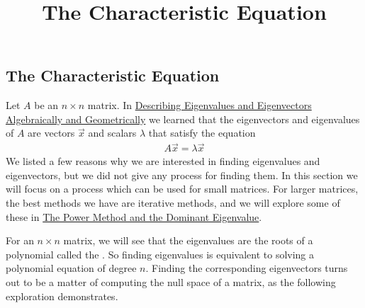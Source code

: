 \documentclass{ximera}
\title{The Characteristic Equation} \license{CC BY-NC-SA 4.0}
\begin{document}
\begin{abstract}

\end{abstract}
\maketitle

\begin{onlineOnly}
\section*{The Characteristic Equation}
\end{onlineOnly}

Let $A$ be an $n \times n$ matrix.  In \href{https://ximera.osu.edu/oerlinalg/LinearAlgebra/EIG-0010/main}{Describing Eigenvalues and Eigenvectors Algebraically and Geometrically} we learned that the eigenvectors and eigenvalues of $A$ are vectors $\vec{x}$ and scalars $\lambda$ that satisfy the equation  
\begin{align}\label{def:eigen} A \vec{x} = \lambda \vec{x}\end{align}
We listed a few reasons why we are interested in finding eigenvalues and eigenvectors, but we did not give any process for finding them.  In this section we will focus on a process which can be used for small matrices.  For larger matrices, the best methods we have are iterative methods, and we will explore some of these in \href{https://ximera.osu.edu/oerlinalg/LinearAlgebra/EIG-0070/main}{The Power Method and the Dominant Eigenvalue}.

For an $n \times n$ matrix, we will see that the eigenvalues are the roots of a polynomial called the .  So finding eigenvalues is equivalent to solving a polynomial equation of degree $n$.  Finding the corresponding eigenvectors turns out to be a matter of computing the null space of a matrix, as the following exploration demonstrates.
\end{document}
